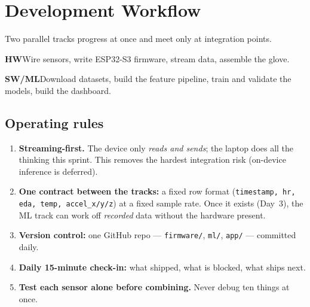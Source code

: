 \documentclass[11pt]{article}
\newcommand{\pill}[2]{\colorbox{#1}{\color{white}\footnotesize\sffamily\bfseries #2}}
\begin{document}
\section{Development Workflow}\label{sec:workflow}

Two parallel tracks progress at once and meet only at integration points.

\noindent
\begin{minipage}[t]{0.485\linewidth}
\begin{tcolorbox}[title={Hardware / Firmware}, colframe=nsteal, colbacktitle=nsteal!15,
  coltitle=nsgrey, colback=white, fonttitle=\sffamily\bfseries, arc=3pt, boxrule=1pt]
\pill{nsteal}{HW}\hspace{5pt}Wire sensors, write ESP32-S3 firmware, stream data, assemble the glove.
\end{tcolorbox}
\end{minipage}\hfill
\begin{minipage}[t]{0.485\linewidth}
\begin{tcolorbox}[title={Data / ML}, colframe=amber, colbacktitle=amber!16,
  coltitle=nsgrey, colback=white, fonttitle=\sffamily\bfseries, arc=3pt, boxrule=1pt]
\pill{amber}{SW/ML}\hspace{5pt}Download datasets, build the feature pipeline, train and validate the
models, build the dashboard.
\end{tcolorbox}
\end{minipage}

\subsection{Operating rules}
\begin{enumerate}[leftmargin=1.6em, itemsep=4pt]
\item \textbf{Streaming-first.} The device only \emph{reads and sends}; the laptop does all the
thinking this sprint. This removes the hardest integration risk (on-device inference is deferred).
\item \textbf{One contract between the tracks:} a fixed row format
(\texttt{timestamp, hr, eda, temp, accel\_x/y/z}) at a fixed sample rate. Once it exists (Day~3), the
ML track can work off \emph{recorded} data without the hardware present.
\item \textbf{Version control:} one GitHub repo --- \texttt{firmware/}, \texttt{ml/}, \texttt{app/}
--- committed daily.
\item \textbf{Daily 15-minute check-in:} what shipped, what is blocked, what ships next.
\item \textbf{Test each sensor alone before combining.} Never debug ten things at once.
\end{enumerate}
\end{document}
